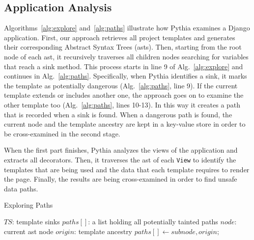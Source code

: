 \subsection{Application Analysis}
\label{sec:analysis}

Algorithms~\ref{alg:explore}
and~\ref{alg:paths} illustrate
how Pythia examines a Django application.
First,
our approach retrieves all project templates
and generates their corresponding
Abstract Syntax Trees ({\sc ast}s).
Then,
starting from the root node of each {\sc ast},
it recursively traverses all children
nodes searching for variables that
reach a sink method.
This process starts in line 9
of Alg.~\ref{alg:explore} and continues
in Alg.~\ref{alg:paths}.
Specifically,
when Pythia identifies a sink,
it marks the template as potentially
dangerous (Alg.~\ref{alg:paths}, line 9).
If the current template extends or
includes another one,
the approach goes on to examine
the other template too
(Alg.~\ref{alg:paths}, lines 10-13).
In this way it creates a path that
is recorded when a sink is found.
When a dangerous path is found, the current node 
and the template ancestry are kept in a key-value store in 
order to be cross-examined in the second stage.

When the first part finishes,
Pythia analyzes the views of the application
and extracts all decorators.
Then,
it traverses the {\sc ast} of each {\tt View}
to identify the templates that are being used
and the data that each template requires 
to render the page.
Finally,
the results are 
being cross-examined in order to find
unsafe data paths.

\vspace{-2mm}

\begin{algorithm}[b]
\caption{Exploring Paths}
\label{alg:paths}
\begin{algorithmic}[1]
 $TS$: template sinks
 $paths[]$: a list holding all
potentially tainted paths
 $node$: current {\sc ast} node
 $origin$: template ancestry
      \State $paths[] \gets subnode, origin;$
    \EndIf
\EndIf
\EndFor
\EndFunction
\end{algorithmic}
\end{algorithm}


